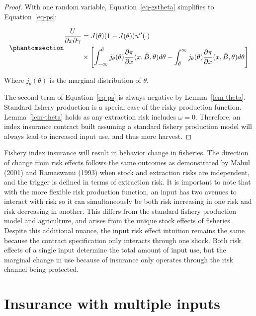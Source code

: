 \documentclass[
  letterpaper,
  DIV=11,
  numbers=noendperiod]{scrartcl}
\theoremstyle{plain}
\theoremstyle{plain}
\theoremstyle{remark}
\begin{document}
\begin{proof}
With one random variable, Equation~\ref{eq-gstheta} simplifies to
Equation~\ref{eq-ps}:

\begin{equation}\phantomsection\label{eq-ps}{
\begin{aligned}
\frac{U}{\partial x \partial \gamma}&=J(\bar\theta)(1-J(\bar\theta))u''(\cdot)\\
&\times\left[\int^{\bar\theta}_{-\infty}j_{\theta}(\theta)\frac{\partial \pi}{\partial x}(x,\hat{B},\theta)d\theta-\int^{\infty}_{\bar{\theta}}j_{\theta}(\theta)\frac{\partial \pi}{\partial x}(x,\hat{B},\theta)d\theta\right ]
\end{aligned}
}\end{equation}

Where \(j_\theta(\theta)\) is the marginal distribution of \(\theta\).

The second term of Equation~\ref{eq-ps} is always negative by
Lemma~\ref{lem-theta}. Standard fishery production is a special case of
the risky production function. Lemma~\ref{lem-theta} holds as any
extraction risk includes \(\omega=0\). Therefore, an index insurance
contract built assuming a standard fishery production model will always
lead to increased input use, and thus more harvest.
\end{proof}

Fishery index insurance will result in behavior change in fisheries. The
direction of change from risk effects follows the same outcomes as
demonstrated by Mahul (2001) and Ramaswami (1993) when stock and
extraction risks are independent, and the trigger is defined in terms of
extraction risk. It is important to note that with the more flexible
risk production function, an input has two avenues to interact with risk
so it can simultaneously be both risk increasing in one risk and risk
decreasing in another. This differs from the standard fishery production
model and agriculture, and arises from the unique stock effects of
fisheries. Despite this additional nuance, the input risk effect
intuition remains the same because the contract specification only
interacts through one shock. Both risk effects of a single input
determine the total amount of input use, but the marginal change in use
because of insurance only operates through the risk channel being
protected.

\section{Insurance with multiple inputs}\label{sec-multi}
\end{document}
